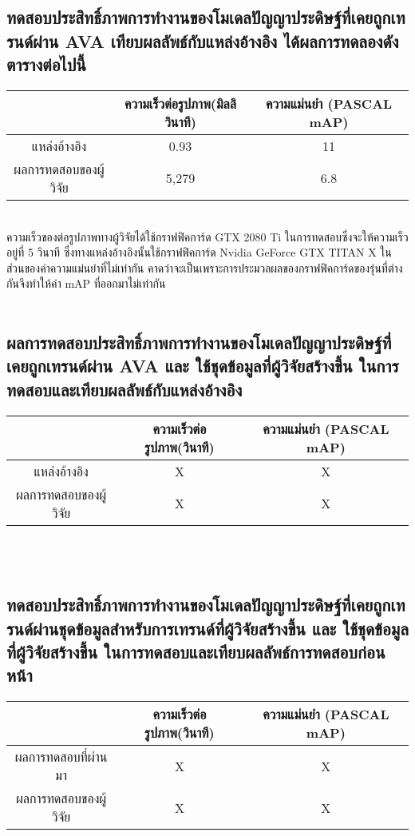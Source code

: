 \subsection{ทดสอบประสิทธิ์ภาพการทำงานของโมเดลปัญญาประดิษฐ์ที่เคยถูกเทรนด์ผ่าน AVA เทียบผลลัพธ์กับแหล่งอ้างอิง ได้ผลการทดลองดังตารางต่อไปนี้}
\begin{tabular}{|c|c|c|}
		\hline
		{}&{ความเร็วต่อรูปภาพ(มิลลิวินาที)}&{ความแม่นยำ (PASCAL mAP)}			\\
		\hline
		แหล่งอ้างอิง	 					& 0.93		& 11														\\
		ผลการทดสอบของผู้วิจัย				& 5,279  		& 6.8				\\
		\hline
\end{tabular}
\\
ความเร็วของต่อรูปภาพทางผู้วิจัยได้ใช้กราฟฟิคการ์ด GTX 2080 Ti ในการทดสอบซึ่งจะให้ความเร็วอยู่ที่ 5 วินาที ซึ่งทางแหล่งอ้างอิงนั้นใช้กราฟฟิคการ์ด Nvidia GeForce GTX TITAN X ในส่วนของค่าความแม่นยำที่ไม่เท่ากัน คาดว่าจะเป็นเพราะการประมวลผลของกราฟฟิคการ์ดของรุ่นที่ต่างกันจึงทำให้ค่า mAP ที่ออกมาไม่เท่ากัน
\\\\
\subsection{ผลการทดสอบประสิทธิ์ภาพการทำงานของโมเดลปัญญาประดิษฐ์ที่เคยถูกเทรนด์ผ่าน AVA และ ใช้ชุดข้อมูลที่ผู้วิจัยสร้างขึ้น ในการทดสอบและเทียบผลลัพธ์กับแหล่งอ้างอิง}
\begin{tabular}{|c|c|c|}
		\hline
		{}&{ความเร็วต่อรูปภาพ(วินาที)}&{ความแม่นยำ (PASCAL mAP)}			\\
		\hline
		แหล่งอ้างอิง	 					& X			& X														\\
		ผลการทดสอบของผู้วิจัย				& X			& X				\\
		\hline
\end{tabular}
\\\\
\subsection{ทดสอบประสิทธิ์ภาพการทำงานของโมเดลปัญญาประดิษฐ์ที่เคยถูกเทรนด์ผ่านชุดข้อมูลสำหรับการเทรนด์ที่ผู้วิจัยสร้างขึ้น และ ใช้ชุดข้อมูลที่ผู้วิจัยสร้างขึ้น ในการทดสอบและเทียบผลลัพธ์การทดสอบก่อนหน้า}
\begin{tabular}{|c|c|c|}
		\hline
		{}&{ความเร็วต่อรูปภาพ(วินาที)}&{ความแม่นยำ (PASCAL mAP)}			\\
		\hline
		ผลการทดสอบที่ผ่านมา	 				& X			& X					\\
		ผลการทดสอบของผู้วิจัย				& X			& X				\\
		\hline
\end{tabular}
